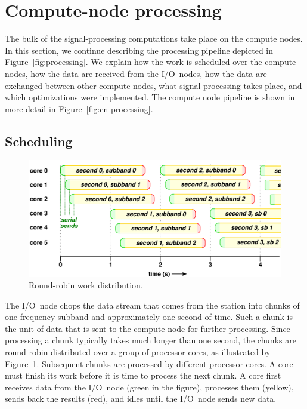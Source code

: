 \documentclass{sig-alternate}
\begin{document}
\section{Compute-node processing}
\label{sec:CNProc}

The bulk of the signal-processing computations take place on the compute nodes.
In this section, we continue describing the processing pipeline depicted in
Figure~\ref{fig:processing}. 
We explain how the work is scheduled over the compute nodes, how the data are
received from the I/O~nodes, how the data are exchanged between other compute
nodes, what signal processing takes place, and which optimizations were
implemented.
The compute node pipeline is shown in more detail in
Figure~\ref{fig:cn-processing}.


\subsection{Scheduling}

\begin{figure}[ht]
\includegraphics[width=\columnwidth]{round-robin.pdf}
\caption{Round-robin work distribution.}
\label{fig:round-robin}
\end{figure}

The I/O~node chops the data stream that comes from the station into chunks of
one frequency subband and approximately one second of time.
Such a chunk is the unit of data that is sent to the compute node for further
processing.
Since processing a chunk typically takes much longer than one second,
the chunks are round-robin distributed over a group of processor cores,
as illustrated by Figure~\ref{fig:round-robin}.
Subsequent chunks are processed by different processor cores.
A core must finish its work before it is time to process the next chunk.
A core first receives data from the I/O~node (green in the figure),
processes them (yellow), sends back the results (red), and idles until the
I/O~node sends new data.
\end{document}
